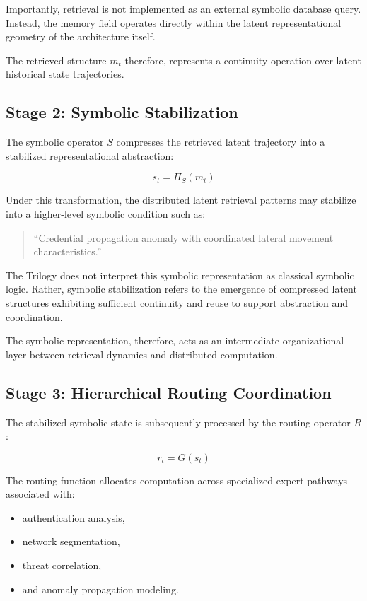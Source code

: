 Importantly, retrieval is not implemented as an external symbolic
database query. Instead, the memory field operates directly within
the latent representational geometry of the architecture itself.

The retrieved structure \(m_t\) therefore, represents a continuity
operation over latent historical state trajectories.

\subsection*{Stage 2: Symbolic Stabilization}

The symbolic operator \(S\) compresses the retrieved latent
trajectory into a stabilized representational abstraction:

\[
s_t = \Pi_S(m_t)
\]

Under this transformation, the distributed latent retrieval patterns may stabilize into a higher-level symbolic condition
such as:

\begin{quote}
``Credential propagation anomaly with coordinated lateral movement
characteristics.''
\end{quote}

The Trilogy does not interpret this symbolic representation as
classical symbolic logic. Rather, symbolic stabilization refers
to the emergence of compressed latent structures exhibiting
sufficient continuity and reuse to support abstraction and
coordination.

The symbolic representation, therefore, acts as an intermediate
organizational layer between retrieval dynamics and distributed
computation.

\subsection*{Stage 3: Hierarchical Routing Coordination}

The stabilized symbolic state is subsequently processed by the
routing operator \(R\):

\[
r_t = G(s_t)
\]

The routing function allocates computation across specialized
expert pathways associated with:

\begin{itemize}
    \item authentication analysis,
    \item network segmentation,
    \item threat correlation,
    \item and anomaly propagation modeling.
\end{itemize}

